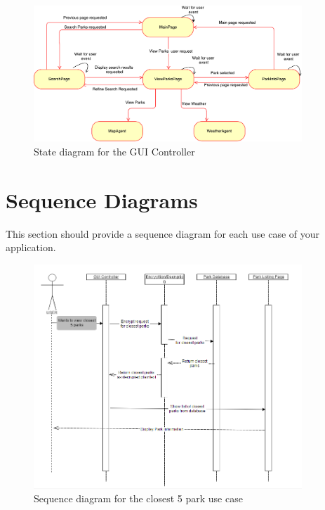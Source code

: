 \documentclass[titlepage,12pt]{article}
\begin{document}
\begin{figure}[H]
    \centerline{\includegraphics[width=0.90\textwidth]{state_diagrams/GUI_Controller}}
    \caption{State diagram for the GUI Controller}
    \label{fig:gui_controller}
\end{figure}

\newpage
\section{Sequence Diagrams}
\label{sec:sequence_diagrams}
This section should provide a sequence diagram for each use case of your application.

\begin{figure}[H]
	\centerline{\includegraphics[width=0.90\textwidth]{sequence_diagrams/Closest5Parks}}
	\caption{Sequence diagram for the closest 5 park use case}
	\label{fig:SD1}
\end{figure}
\end{document}
